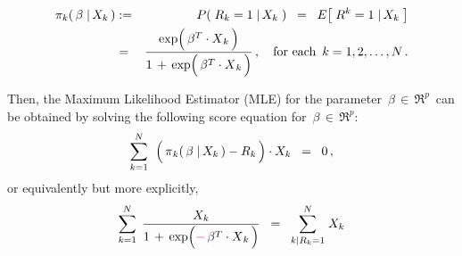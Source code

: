 \begin{proposition}
\begin{enumerate}
\begin{itemize}
\begin{eqnarray*}
		\pi_{k}(\,\beta\;\vert\,X_{k}\,)
		& := &
			P\!\left(\; R_{k} = 1 \;\vert\, X_{k} \;\right)
		\;\; = \;\;
			E\!\left[\; R^{k}  = 1 \;\vert\, X_{k} \;\right]
		\\
		& = &
			\dfrac{
				\exp\!\left(\,\beta^{T} \cdot \overset{{\color{white}.}}{X}_{k} \,\right)
				}{
				1 \,+\, \exp\!\left(\,\beta^{T} \cdot \overset{{\color{white}.}}{X}_{k} \,\right)
				}\,,
		\quad
		\textnormal{for each \,$k = 1,2,\ldots,N$}\,.
		\end{eqnarray*}
	\end{itemize}
	Then, the Maximum Likelihood Estimator (MLE) for the parameter \,$\beta \,\in\, \Re^{p}$\,
	can be obtained by solving the following score equation for \,$\beta \,\in\, \Re^{p}$:
	\begin{equation*}
	\overset{N}{\underset{k=1}{\sum}}\;\,
	\left(\,\overset{{\color{white}-}}{\pi}_{k}(\,\beta\;\vert\,X_{k}\,) - R_{k}\,\right)
	\cdot X_{k}
	\;\; = \;\; 0\,,
	\end{equation*}
	or equivalently but more explicitly,
	\begin{equation*}
	\overset{N}{\underset{k=1}{\sum}}\;\,
	\dfrac{X_{k}}{1 \,+\, \exp\!\left({\color{red}-}\,\beta^{T} \cdot \overset{{\color{white}.}}{X}_{k}\,\right)}
	\;\; = \;\;
	\overset{N}{\underset{k\vert R_{k}=1}{\sum}}\; X_{k}
	\end{equation*}
\end{enumerate}
\end{proposition}
\proof
